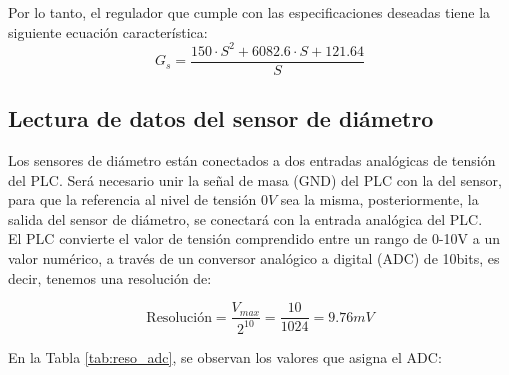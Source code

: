 Por lo tanto, el regulador que cumple con las especificaciones deseadas tiene la siguiente ecuación característica:
\begin{equation}
G_s = \frac{150 \cdot S^2 + 6082.6 \cdot S + 121.64}{S}
\end{equation}


\subsection{Lectura de datos del sensor de diámetro}
\label{sec:plc_diametro}

Los sensores de diámetro están conectados a dos entradas analógicas de tensión del PLC. Será necesario unir la señal de masa (GND) del PLC con la del sensor, para que la referencia al nivel de tensión $0 V$ sea la misma, posteriormente, la salida del sensor de diámetro, se conectará con la entrada analógica del PLC.\\

El PLC convierte el valor de tensión comprendido entre un rango de 0-10V a un valor numérico, a través de un conversor analógico a digital (ADC) de 10bits, es decir, tenemos una resolución de:

\begin{equation}
    \text{Resolución}=\frac{ V_{max} } {2^{10} } = \frac{10}{1024} = 9.76 mV
\end{equation}

En la Tabla \ref{tab:reso_adc}, se observan los valores que asigna el ADC:


